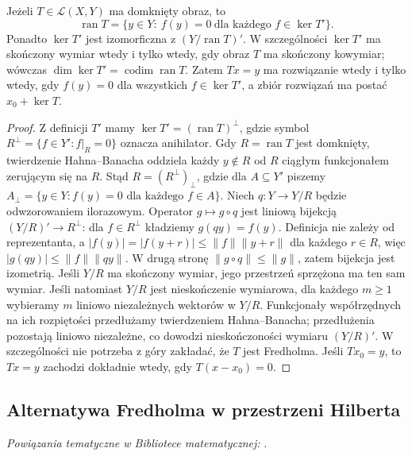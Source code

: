 \begin{twierdzenie}
\label{thm:fredholm-compatibility30}
Jeżeli $T\in\mathcal L(X,Y)$ ma domknięty obraz, to
\[\operatorname{ran}T=\{y\in Y:\ f(y)=0\ \text{dla każdego }f\in\ker T'\}.\]
Ponadto $\ker T'$ jest izomorficzna z $(Y/\operatorname{ran}T)'$.
W szczególności $\ker T'$ ma skończony wymiar wtedy i tylko wtedy,
gdy obraz $T$ ma skończony kowymiar; wówczas
$\dim\ker T'=\operatorname{codim}\operatorname{ran}T$.
Zatem $Tx=y$ ma rozwiązanie wtedy i tylko wtedy, gdy
$f(y)=0$ dla wszystkich $f\in\ker T'$, a zbiór
rozwiązań ma postać $x_0+\ker T$.
\end{twierdzenie}
\begin{proof}
Z definicji $T'$ mamy $\ker T'=(\operatorname{ran}T)^\perp$,
gdzie symbol $R^\perp=\{f\in Y':f|_R=0\}$ oznacza
anihilator. Gdy $R=\operatorname{ran}T$ jest domknięty,
twierdzenie Hahna--Banacha oddziela każdy $y\notin R$
od $R$ ciągłym funkcjonałem zerującym się na $R$.
Stąd $R=(R^\perp)_\perp$, gdzie dla $A\subseteq Y'$
piszemy $A_\perp=\{y\in Y:f(y)=0\text{ dla każdego }f\in A\}$.
Niech $q:Y\to Y/R$ będzie
odwzorowaniem ilorazowym. Operator $g\mapsto g\circ q$
jest liniową bijekcją $(Y/R)'\to R^\perp$:
dla $f\in R^\perp$ kładziemy $g(qy)=f(y)$.
Definicja nie zależy od reprezentanta, a
$|f(y)|=|f(y+r)|\le\|f\|\|y+r\|$ dla każdego $r\in R$,
więc $|g(qy)|\le\|f\|\|qy\|$. W drugą stronę
$\|g\circ q\|\le\|g\|$, zatem bijekcja jest izometrią.
Jeśli $Y/R$ ma skończony wymiar, jego przestrzeń sprzężona
ma ten sam wymiar. Jeśli natomiast $Y/R$ jest nieskończenie
wymiarowa, dla każdego $m\ge1$ wybieramy $m$ liniowo
niezależnych wektorów w $Y/R$. Funkcjonały współrzędnych
na ich rozpiętości przedłużamy twierdzeniem Hahna--Banacha;
przedłużenia pozostają liniowo niezależne, co dowodzi
nieskończoności wymiaru $(Y/R)'$. W szczególności nie
potrzeba z góry zakładać, że $T$ jest Fredholma.
Jeśli $Tx_0=y$, to $Tx=y$ zachodzi dokładnie wtedy,
gdy $T(x-x_0)=0$.
\end{proof}

\subsection{Alternatywa Fredholma w przestrzeni Hilberta}

\noindent\emph{Powiązania tematyczne w Bibliotece matematycznej:} .


